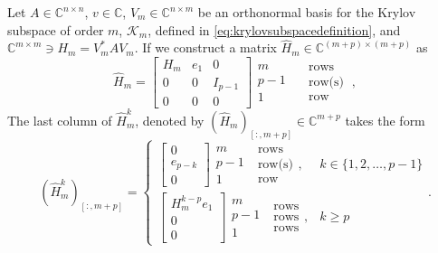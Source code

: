 \begin{lemma}
    \label{lem:hhatpowered}
    Let $A \in \mathbb{C}^{n \times n}$, $v \in \mathbb{C}$, $V_m \in \mathbb{C}^{n \times m}$ be an
    orthonormal basis for the Krylov subspace of order $m$, $\mathcal{K}_m$, defined in \eqref{eq:krylovsubspacedefinition},
    and $\mathbb{C}^{m \times m} \ni H_m = V_m^* A V_m$. If we construct a matrix $\hat{H}_m \in \mathbb{C}^{(m+p) \times (m+p)}$ as
    \begin{equation}
        \label{eq:hhatdefinition}
        \hat{H}_m =
        \begin{bmatrix}
            H_m & e_1 & 0       \\
            0   & 0   & I_{p-1} \\
            0   & 0   & 0
        \end{bmatrix}
        \begin{matrix} m \\ p-1 \\ 1 \end{matrix}
        \begin{matrix} \quad \text{rows} \\ \quad \text{row(s)} \\ \quad \text{row} \end{matrix}
        \: ,
    \end{equation}
    The last column of $\hat{H}_m^k$, denoted by $(\hat{H}_m)_{[:, m+p]} \in \mathbb{C}^{m+p}$ takes the form
    \begin{equation*}
        \label{eq:hhatpowered}
        (\hat{H}_m^k)_{[:, m+p]} =
        \begin{cases}
            \begin{bmatrix} 0 \\ e_{p-k} \\ 0 \end{bmatrix}
            \begin{matrix} m \\ p-1 \\ 1 \end{matrix}
            \; \begin{matrix} \text{rows} \\ \text{row(s)} \\ \text{row} \end{matrix},
            & k \in \{ 1, 2, \dots, p-1 \}
            \\
            \begin{bmatrix} H_m^{k-p} e_1 \\ 0 \\ 0 \end{bmatrix}
            \begin{matrix} m \\ p-1 \\ 1 \end{matrix}
            \; \begin{matrix} \text{rows} \\ \text{rows} \\ \text{rows} \end{matrix},
            & k \ge p
        \end{cases}.
    \end{equation*}
\end{lemma}
